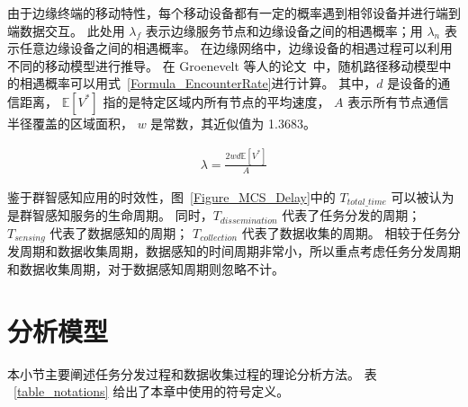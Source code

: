 由于边缘终端的移动特性，每个移动设备都有一定的概率遇到相邻设备并进行端到端数据交互。
此处用 $\lambda_f$ 表示边缘服务节点和边缘设备之间的相遇概率；用 $\lambda_n$ 表示任意边缘设备之间的相遇概率。
在边缘网络中，边缘设备的相遇过程可以利用不同的移动模型进行推导。
在 Groenevelt 等人的论文~\cite{DBLP:journals/pe/GroeneveltNK05}中，随机路径移动模型中的相遇概率可以用式~\ref{Formula_EncounterRate}进行计算。
其中，$d$ 是设备的通信距离，
$\mathbb{E}[V^*]$ 指的是特定区域内所有节点的平均速度，
$A$ 表示所有节点通信半径覆盖的区域面积，
$w$ 是常数，其近似值为 1.3683。

\begin{equation}
  \label{Formula_EncounterRate}
  \begin{gathered}
  \lambda = \frac{2 w d \mathbb{E}[V^*]}{A}
  \end{gathered}
\end{equation}


鉴于群智感知应用的时效性，图~\ref{Figure_MCS_Delay}中的 $T_{total\_time}$ 可以被认为是群智感知服务的生命周期。
同时，$T_{dissemination}$ 代表了任务分发的周期；
$T_{sensing}$ 代表了数据感知的周期；
$T_{collection}$ 代表了数据收集的周期。
相较于任务分发周期和数据收集周期，数据感知的时间周期非常小，所以重点考虑任务分发周期和数据收集周期，对于数据感知周期则忽略不计。

\section{分析模型}
本小节主要阐述任务分发过程和数据收集过程的理论分析方法。
表 ~\ref{table_notations} 给出了本章中使用的符号定义。

